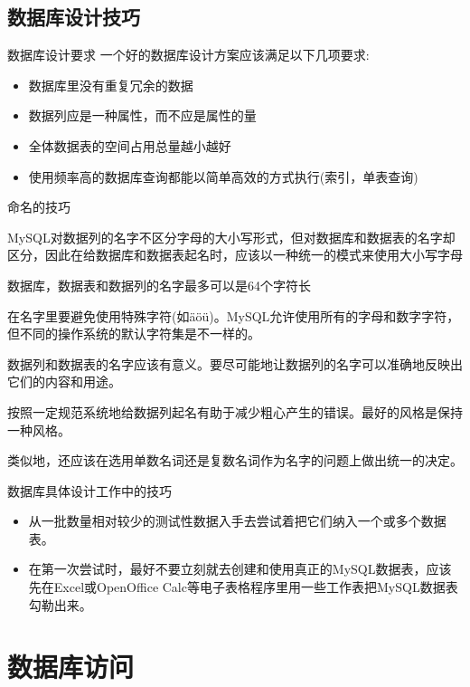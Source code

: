 \documentclass[CJK]{beamer}
\begin{document}
\begin{CJK*}{UTF8}{gbsn}
\subsection{数据库设计技巧}
\begin{frame}{数据库设计要求}
一个好的数据库设计方案应该满足以下几项要求:
\begin{itemize}
	\item 数据库里没有重复冗余的数据
	\item 数据列应是一种属性，而不应是属性的量
	\item 全体数据表的空间占用总量越小越好
	\item 使用频率高的数据库查询都能以简单高效的方式执行(索引，单表查询)
\end{itemize}
\end{frame}

\begin{frame}{命名的技巧}
\begin{itemize}
{\tiny
	\item MySQL对数据列的名字不区分字母的大小写形式，但对数据库和数据表的名字却区分，因此在给数据库和数据表起名时，应该以一种统一的模式来使用大小写字母
	\item 数据库，数据表和数据列的名字最多可以是64个字符长
	\item 在名字里要避免使用特殊字符(如\"{a}\"{o}\"{u})。MySQL允许使用所有的字母和数字字符，但不同的操作系统的默认字符集是不一样的。
	\item 数据列和数据表的名字应该有意义。要尽可能地让数据列的名字可以准确地反映出它们的内容和用途。
	\item 按照一定规范系统地给数据列起名有助于减少粗心产生的错误。最好的风格是保持一种风格。
	\item 类似地，还应该在选用单数名词还是复数名词作为名字的问题上做出统一的决定。
}
\end{itemize}
\end{frame}
\begin{frame}{数据库具体设计工作中的技巧}
\begin{itemize}
	\item 从一批数量相对较少的测试性数据入手去尝试着把它们纳入一个或多个数据表。
	\item 在第一次尝试时，最好不要立刻就去创建和使用真正的MySQL数据表，应该先在Excel或OpenOffice Calc等电子表格程序里用一些工作表把MySQL数据表勾勒出来。
\end{itemize}
\end{frame}
\section{数据库访问}

\end{CJK*}
\end{document}

